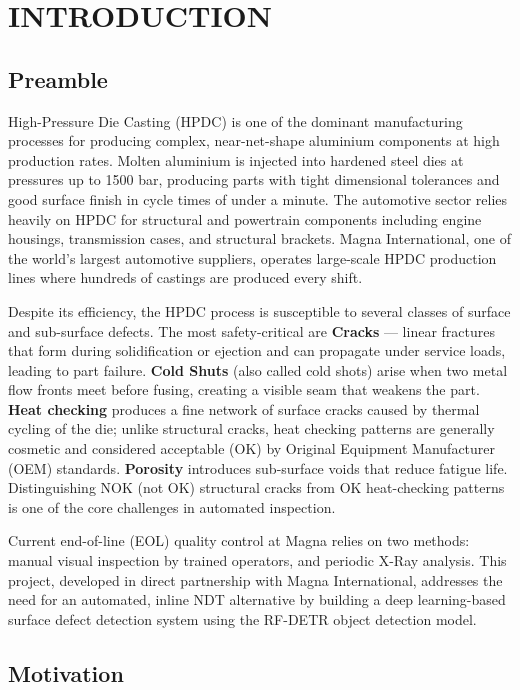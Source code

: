 \chapter{INTRODUCTION}

\justify

\section{Preamble}

High-Pressure Die Casting (HPDC) is one of the dominant manufacturing processes for producing complex, near-net-shape aluminium components at high production rates. Molten aluminium is injected into hardened steel dies at pressures up to 1500 bar, producing parts with tight dimensional tolerances and good surface finish in cycle times of under a minute. The automotive sector relies heavily on HPDC for structural and powertrain components including engine housings, transmission cases, and structural brackets. Magna International, one of the world's largest automotive suppliers, operates large-scale HPDC production lines where hundreds of castings are produced every shift.

Despite its efficiency, the HPDC process is susceptible to several classes of surface and sub-surface defects. The most safety-critical are \textbf{Cracks} --- linear fractures that form during solidification or ejection and can propagate under service loads, leading to part failure. \textbf{Cold Shuts} (also called cold shots) arise when two metal flow fronts meet before fusing, creating a visible seam that weakens the part. \textbf{Heat checking} produces a fine network of surface cracks caused by thermal cycling of the die; unlike structural cracks, heat checking patterns are generally cosmetic and considered acceptable (OK) by Original Equipment Manufacturer (OEM) standards. \textbf{Porosity} introduces sub-surface voids that reduce fatigue life. Distinguishing NOK (not OK) structural cracks from OK heat-checking patterns is one of the core challenges in automated inspection.

Current end-of-line (EOL) quality control at Magna relies on two methods: manual visual inspection by trained operators, and periodic X-Ray analysis. This project, developed in direct partnership with Magna International, addresses the need for an automated, inline NDT alternative by building a deep learning-based surface defect detection system using the RF-DETR object detection model.

\section{Motivation}

